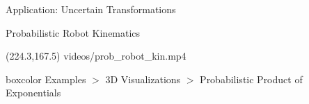 \documentclass[14pt,aspectratio=169]{beamer}
\begin{document}
\begin{frame}
\begin{center}
\Large
Application: Uncertain Transformations
\end{center}
\end{frame}

\begin{frame}[fragile]{Probabilistic Robot Kinematics}
\begin{center}
\makebox(224.3,167.5){
{videos/prob_robot_kin.mp4}}
\end{center}

\begin{beamercolorbox}[wd=0.9\textwidth,sep=5pt]{boxcolor}
Examples $>$ 3D Visualizations $>$ Probabilistic Product of Exponentials
\end{beamercolorbox}
\end{frame}
\end{document}
